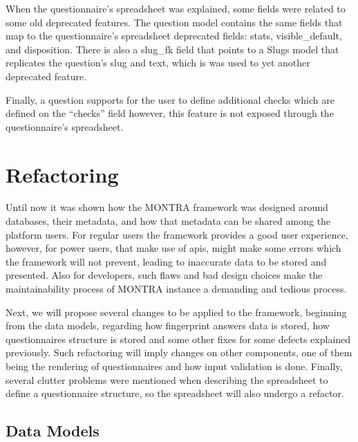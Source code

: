 When the questionnaire's spreadsheet was explained, some fields were related to some old deprecated features.
The question model contains the same fields that map to the questionnaire's spreadsheet deprecated fields: stats, visible\_default, and disposition.
There is also a slug\_fk field that points to a Slugs model that replicates the question's slug and text, which is was used to yet another deprecated feature.

Finally, a question supports for the user to define additional checks which are defined on the ``checks'' field however, this feature is not exposed through the questionnaire's spreadsheet.

\section{Refactoring}


Until now it was shown how the MONTRA framework was designed around databases, their metadata, and how that metadata can be shared among the platform users.
For regular users the framework provides a good user experience, however, for power users, that make use of \gls{api}s, might make some errors which the framework will not prevent, leading to inaccurate data to be stored and presented.
Also for developers, such flaws and bad design choices make the maintainability process of MONTRA instance a demanding and tedious process.

Next, we will propose several changes to be applied to the framework, beginning from the data models, regarding how fingerprint answers data is stored, how questionnaires structure is stored and some other fixes for some defects explained previously.
Such refactoring will imply changes on other components, one of them being the rendering of questionnaires and how input validation is done.
Finally, several clutter problems were mentioned when describing the spreadsheet to define a questionnaire structure, so the spreadsheet will also undergo a refactor.

\subsection{Data Models}


